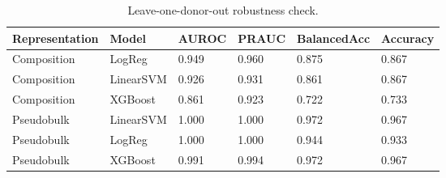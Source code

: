 \begin{table}
\caption{Leave-one-donor-out robustness check.}
\begin{tabular}{llllll}
\toprule
Representation & Model & AUROC & PRAUC & BalancedAcc & Accuracy \\
\midrule
Composition & LogReg & 0.949 & 0.960 & 0.875 & 0.867 \\
Composition & LinearSVM & 0.926 & 0.931 & 0.861 & 0.867 \\
Composition & XGBoost & 0.861 & 0.923 & 0.722 & 0.733 \\
Pseudobulk & LinearSVM & 1.000 & 1.000 & 0.972 & 0.967 \\
Pseudobulk & LogReg & 1.000 & 1.000 & 0.944 & 0.933 \\
Pseudobulk & XGBoost & 0.991 & 0.994 & 0.972 & 0.967 \\
\bottomrule
\end{tabular}
\end{table}

